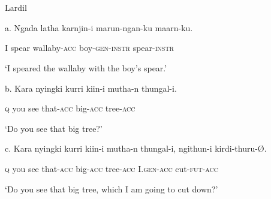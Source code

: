 \documentclass[output=paper]{langsci/langscibook}
\begin{document}
\begin{styleSfondomedioiColorexxi}
\ea%
    \label{ex:key:8}
    \gll\\
        \\
    \glt
    \z

           Lardil  \citep[47]{Richards2013}
\end{styleSfondomedioiColorexxi}

\begin{styleSfondomedioiColorexxi}
a.  Ngada latha   karnjin-i   marun-ngan-ku   maarn-ku.     
\end{styleSfondomedioiColorexxi}

\begin{styleSfondomedioiColorexxi}
I   spear   wallaby-\textsc{acc} boy-\textsc{gen-instr}  spear-\textsc{instr} 
\end{styleSfondomedioiColorexxi}

\begin{styleSfondomedioiColorexxi}
‘I speared the wallaby with the boy’s spear.’    
\end{styleSfondomedioiColorexxi}

\begin{styleSfondomedioiColorexxi}
b.  Kara   nyingki   kurri   kiin-i     mutha-n   thungal-i. 
\end{styleSfondomedioiColorexxi}

\begin{styleSfondomedioiColorexxi}
\textsc{q}    you     see   that-\textsc{acc}    big-\textsc{acc}    tree\textsc{{}-acc} 
\end{styleSfondomedioiColorexxi}

\begin{styleSfondomedioiColorexxi}
‘Do you see that big tree?’
\end{styleSfondomedioiColorexxi}

\begin{styleSfondomedioiColorexxi}
    c.   Kara   nyingki kurri kiin-i     mutha-n thungal-i,   ngithun-i kirdi-thuru-Ø. 
\end{styleSfondomedioiColorexxi}

\begin{styleSfondomedioiColorexxi}
\textsc{q}  you     see   that-\textsc{acc}    big-\textsc{acc}   tree-\textsc{acc}    I.\textsc{gen-acc}  cut-\textsc{fut-acc} 
\end{styleSfondomedioiColorexxi}

\begin{styleSfondomedioiColorexxi}
‘Do you see that big tree, which I am going to cut down?’ 
\end{styleSfondomedioiColorexxi}
\end{document}
